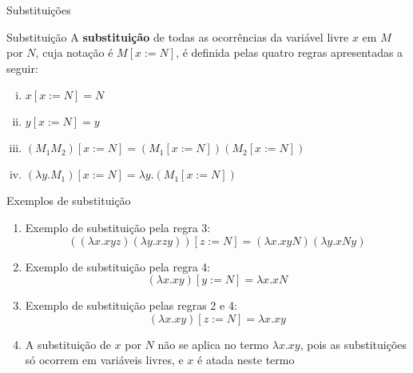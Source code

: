 \begin{frame}[fragile]{Substituições}

    \begin{block}{Substituição}
    A \textbf{substituição} de todas as ocorrências da variável livre $x$ em $M$ por $N$, cuja
    notação é $M[x:=N]$, é definida pelas quatro regras apresentadas a seguir:
    \begin{enumerate}[i.]
        \item $x[x:=N] = N$
        \item $y[x:=N] = y$
        \item $(M_1M_2)[x:=N] = (M_1[x:=N])(M_2[x:=N])$
        \item $(\lambda y.M_1)[x:=N] = \lambda y.(M_1[x:=N])$
    \end{enumerate}
    \end{block}

\end{frame}

\begin{frame}[fragile]{Exemplos de substituição}

    \begin{enumerate}
        \item Exemplo de substituição pela regra 3:
        \[
            ((\lambda x.xyz)(\lambda y.xzy))[z:=N] = (\lambda x.xyN)(\lambda y.xNy) 
        \]

        \item Exemplo de substituição pela regra 4:
        \[
            (\lambda x.xy)[y:=N] = \lambda x.xN
        \]

        \item Exemplo de substituição pelas regras 2 e 4:
        \[
            (\lambda x.xy)[z:=N] = \lambda x.xy
        \]

        \item A substituição de $x$ por $N$ não se aplica no termo $\lambda x.xy$,
            pois as substituições só ocorrem em variáveis livres, e $x$ é atada neste termo
    \end{enumerate}

\end{frame}

